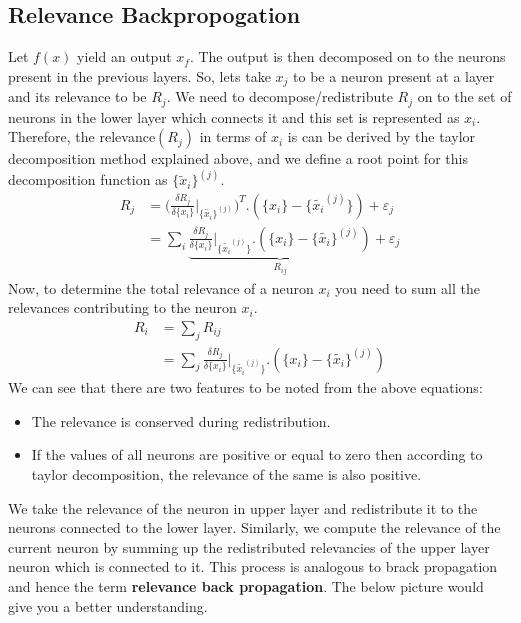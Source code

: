 \documentclass{article}
\begin{document}
	\subsection{Relevance Backpropogation}
	Let $f(x)$ yield an output $x_f$. The output is then decomposed on to the neurons present in the previous layers. So, lets take $x_j$ to be a neuron present at a layer and its relevance to be $R_j$. We need to decompose/redistribute $R_j$ on to the set of neurons in the lower layer which connects it and this set is represented as ${x_i}$. Therefore, the relevance$(R_j)$ in terms of $x_i$ is can be derived by the taylor decomposition method explained above, and we define a root point for this decomposition function as $\{\tilde{x}_i\}^{(j)}$. 
	\begin{align}
		R_j &= \Bigg( 
				\frac{\delta R_j}{\delta \{x_i\}}
				\rvert_{\{\tilde{x_i}\}^{(j)}}
			\Bigg)^T
			. (\{x_i\} - \{ \tilde{x_i}^{(j)}\}) + \varepsilon_j \nonumber \\
		  &= \sum_{i} 
			  \underbrace{\frac{\delta R_j}{\delta \{x_i\}}
			  \rvert_{\{\tilde{x_i}^{(j)}\}}
			  . (\{x_i\} - \{ \tilde{x_i}\}^{(j)})}_{R_{ij}} + \varepsilon_j
	\end{align}
	Now, to determine the total relevance of a neuron $x_i$ you need to sum all the relevances contributing to the neuron $x_i$. 
	\begin{align}
		R_i &= \sum_{j} R_{ij} \nonumber \\
		&= \sum_{j} 
		\frac{\delta R_j}{\delta \{x_i\}}
		\rvert_{\{\tilde{x_i}^{(j)}\}}
		. (\{x_i\} - \{ \tilde{x_i}\}^{(j)}) \label{relavance}
	\end{align}
	We can see that there are two features to be noted from the above equations:
	\begin{itemize}
		\item The relevance is conserved during redistribution.
		\item If the values of all neurons  are positive or equal to zero then according to taylor decomposition, the relevance of the same is also positive.
	\end{itemize}
	
	  We take the relevance of the neuron in upper layer and redistribute it to the neurons connected to the lower layer. Similarly, we compute the relevance of the current neuron by summing up the redistributed relevancies of the upper layer neuron which is connected to it. This process is analogous to brack propagation and hence the term \textbf{relevance back propagation}. The below picture would give you a better understanding.
	  
\end{document}
